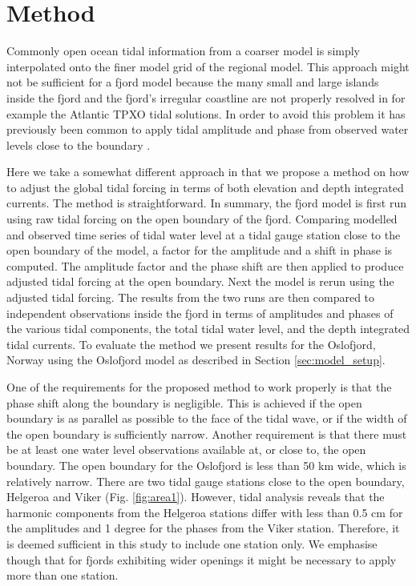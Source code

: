 \section{Method}

Commonly open ocean tidal information from a coarser model is simply interpolated onto the finer model grid of the regional model. This approach might not be sufficient for a fjord model because the many small and large islands inside the fjord and the fjord's irregular coastline are not properly resolved in for example the Atlantic TPXO tidal solutions. In order to avoid this problem it has previously been common to apply tidal amplitude and phase from observed water levels close to the boundary \cite[i.e.]{foreman90,svendsen96,lynge13}. 

Here we take a somewhat different approach in that we propose a method on how to adjust the global tidal forcing in terms of both elevation and depth integrated currents. The method is straightforward. In summary, the fjord model is first run using raw tidal forcing on the open boundary of the fjord. Comparing modelled and observed time series of tidal water level at a tidal gauge station close to the open boundary of the model, a factor for the amplitude and a shift in phase is computed. The amplitude factor and the phase shift are then applied to produce adjusted tidal forcing at the open boundary. Next the model is rerun using the adjusted tidal forcing. The results from the two runs are then compared to independent observations inside the fjord in terms of amplitudes and phases of the various tidal components, the total tidal water level, and the depth integrated tidal currents. To evaluate the method we present results for the Oslofjord, Norway using the Oslofjord model as described in Section \ref{sec:model_setup}. 

One of the requirements for the proposed method to work properly is that the phase shift along the boundary is negligible. This is achieved if the open boundary is as parallel as possible to the face of the tidal wave, or if the width of the open boundary is sufficiently narrow. Another requirement is that there must be at least one water level observations available at, or close to, the open boundary.
The open boundary for the Oslofjord is less than 50 km wide, which is relatively narrow. There are two tidal gauge stations close to the open boundary, Helgeroa and Viker (Fig. \ref{fig:area1}). However, tidal analysis reveals that the harmonic components from the Helgeroa stations differ with less than 0.5 cm for the amplitudes and 1 degree for the phases \cite[]{tide16} from the Viker station. Therefore, it is deemed sufficient in this study to include one station only. We emphasise though that for fjords exhibiting wider openings it might be necessary to apply more than one station. 


